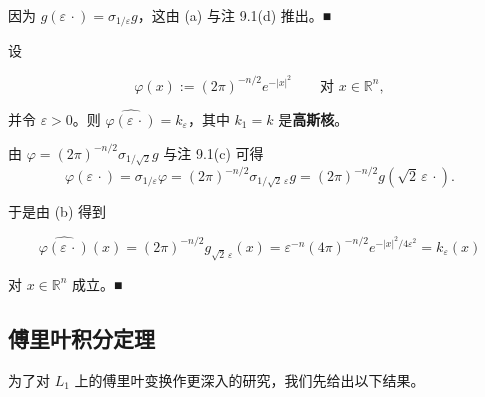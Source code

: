 \begin{example}
\begin{items}
\proofhead
因为 $ g(\varepsilon\,\cdot) = \sigma_{1/\varepsilon}g $，这由 (a) 与注 9.1(d) 推出。\nobreak\hspace{0.35em}■
\item

设

\[
\varphi(x) := (2\pi)^{-n/2}e^{-|x|^2} \qquad \text{对 } x \in \mathbb{R}^n ,
\]

并令 $ \varepsilon > 0 $。则 $ \widehat{\varphi(\varepsilon\,\cdot)} = k_\varepsilon $，其中 $ k_1 = k $ 是\textbf{高斯核}。

\proofhead
由 $ \varphi = (2\pi)^{-n/2}\sigma_{1/\sqrt{2}}g $ 与注 9.1(c) 可得
\[
\varphi(\varepsilon\,\cdot) = \sigma_{1/\varepsilon}\varphi = (2\pi)^{-n/2}\sigma_{1/\sqrt{2}\,\varepsilon}g = (2\pi)^{-n/2}g(\sqrt{2}\,\varepsilon\,\cdot) .
\]

于是由 (b) 得到

\[
\widehat{\varphi(\varepsilon\,\cdot)}(x) = (2\pi)^{-n/2}g_{\sqrt{2}\,\varepsilon}(x) = \varepsilon^{-n}(4\pi)^{-n/2}e^{-|x|^2/4\varepsilon^2} = k_\varepsilon(x)
\]

对 $ x \in \mathbb{R}^n $ 成立。\nobreak\hspace{0.35em}■

\end{items}

\end{example}

\subsection*{傅里叶积分定理}

为了对 $ L_1 $ 上的傅里叶变换作更深入的研究，我们先给出以下结果。

